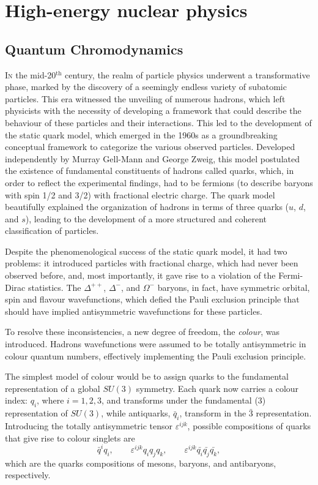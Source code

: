 \chapter{High-energy nuclear physics}
\section{Quantum Chromodynamics}
\lettrine[lines=6,findent=0.pt]{I}{n} the mid-20$^{\mathrm{th}}$ century, the realm of particle physics underwent a transformative phase, marked by the discovery of a seemingly endless variety of subatomic particles. This era witnessed the unveiling of numerous hadrons, which left physicists with the necessity of developing a framework that could describe the behaviour of these particles and their interactions. This led to the development of the static quark model, which emerged in the 1960s as a groundbreaking conceptual framework to categorize the various observed particles. Developed independently by Murray Gell-Mann\cite{Gell-Mann:1964ewy} and George Zweig\cite{Zweig:1964jf, Fritzsch:1972jv}, this model postulated the existence of fundamental constituents of hadrons called quarks, which, in order to reflect the experimental findings, had to be fermions (to describe baryons with spin 1/2 and 3/2) with fractional electric charge. The quark model beautifully explained the organization of hadrons in terms of three quarks ($u$, $d$, and $s$), leading to the development of a more structured and coherent classification of particles.

Despite the phenomenological success of the static quark model, it had two problems: it introduced particles with fractional charge, which had never been observed before, and, most importantly, it gave rise to a violation of the Fermi-Dirac statistics. The $\Delta^{++}$, $\Delta^{-}$, and $\Omega^{-}$ baryons, in fact, have symmetric orbital, spin and flavour wavefunctions, which defied the Pauli exclusion principle that should have implied antisymmetric wavefunctions for these particles.

To resolve these inconsistencies, a new degree of freedom, the \emph{colour}, was introduced. Hadrons wavefunctions were assumed to be totally antisymmetric in colour quantum numbers, effectively implementing the Pauli exclusion principle.

The simplest model of colour would be to assign quarks to the fundamental representation of a global $SU(3)$ symmetry. Each quark now carries a colour index: $q_i$, where $i = 1, 2, 3$, and transforms under the fundamental ($3$) representation of $SU(3)$, while antiquarks,  $\bar{q}_i$, transform in the $\bar{3}$ representation. Introducing the totally antisymmetric tensor $\varepsilon^{ijk}$, possible compositions of quarks that give rise to colour singlets are 
\begin{equation*}
    \bar{q}^iq_i,\qquad \varepsilon^{ijk}q_iq_jq_k,\qquad \varepsilon^{ijk}\bar{q_i}\bar{q_j}\bar{q_k},
\end{equation*}
which are the quarks compositions of mesons, baryons, and antibaryons, respectively. 

